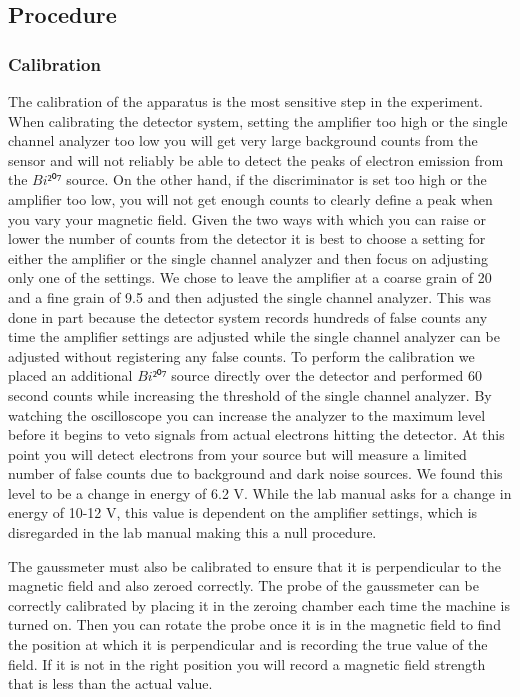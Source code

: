 \subsection{Procedure}

\subsubsection{Calibration}
The calibration of the apparatus is the most sensitive step in the experiment.  When calibrating the detector system, setting the amplifier too high or the single channel analyzer too low you will get very large background counts from the sensor and will not reliably be able to detect the peaks of electron emission from the $Bi²⁰⁷$ source.  On the other hand, if the discriminator is set too high or the amplifier too low, you will not get enough counts to clearly define a peak when you vary your magnetic field. Given the two ways with which you can raise or lower the number of counts from the detector it is best to choose a setting for either the amplifier or the single channel analyzer and then focus on adjusting only one of the settings.  We chose to leave the amplifier at a coarse grain of 20 and a fine grain of 9.5 and then adjusted the single channel analyzer.  This was done in part because the detector system records hundreds of false counts any time the amplifier settings are adjusted while the single channel analyzer can be adjusted without registering any false counts. To perform the calibration we placed an additional $Bi²⁰⁷$ source directly over the detector and performed 60 second counts while increasing the threshold of the single channel analyzer. By watching the oscilloscope you can increase the analyzer to the maximum level before it begins to veto signals from actual electrons hitting the detector. At this point you will detect electrons from your source but will measure a limited number of false counts due to background and dark noise sources.  We found this level to be a change in energy of 6.2 V.  While the lab manual asks for a change in energy of 10-12 V, this value is dependent on the amplifier settings, which is disregarded in the lab manual making this a null procedure.

The gaussmeter must also be calibrated to ensure that it is perpendicular to the magnetic field and also zeroed correctly.  The probe of the gaussmeter can be correctly calibrated by placing it in the zeroing chamber each time the machine is turned on. Then you can rotate the probe once it is in the magnetic field to find the position at which it is perpendicular and is recording the true value of the field. If it is not in the right position you will record a magnetic field strength that is less than the actual value.  

